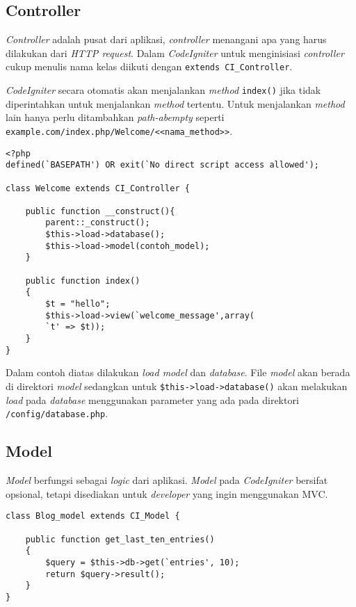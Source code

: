 \subsection{Controller}

\textit{Controller} adalah pusat dari aplikasi, \textit{controller} menangani apa yang harus dilakukan dari \textit{HTTP request}. Dalam \textit{CodeIgniter} untuk menginisiasi \textit{controller} cukup menulis nama kelas diikuti dengan \texttt{extends CI\_Controller}.

\textit{CodeIgniter} secara otomatis akan menjalankan \textit{method} \texttt{index()} jika tidak diperintahkan untuk menjalankan \textit{method} tertentu. Untuk menjalankan \textit{method} lain hanya perlu ditambahkan \textit{path-abempty} seperti  \texttt{example.com/index.php/Welcome/<<nama\_method>>}.

\begin{lstlisting}
<?php
defined(`BASEPATH') OR exit(`No direct script access allowed');
	
class Welcome extends CI_Controller {
	
	public function __construct(){
		parent::_construct();
		$this->load->database();
		$this->load->model(contoh_model);
	}
	
	public function index()
	{
		$t = "hello";
		$this->load->view(`welcome_message',array(
		`t' => $t));
	}
}
\end{lstlisting}


Dalam contoh diatas dilakukan \textit{load model} dan \textit{database}. File \textit{model} akan berada di direktori \textit{model} sedangkan untuk \texttt{\$this->load->database()} akan melakukan \textit{load} pada \textit{database} menggunakan parameter yang ada pada direktori \texttt{/config/database.php}. 


\subsection{Model}

\textit{Model} berfungsi sebagai \textit{logic} dari aplikasi. \textit{ Model} pada \textit{CodeIgniter} bersifat opsional, tetapi disediakan untuk \textit{developer} yang ingin menggunakan MVC\cite{codeigniter3}. 


\begin{lstlisting}
class Blog_model extends CI_Model {
	
	public function get_last_ten_entries()
	{
		$query = $this->db->get(`entries', 10);
		return $query->result();
	}
}
\end{lstlisting}

